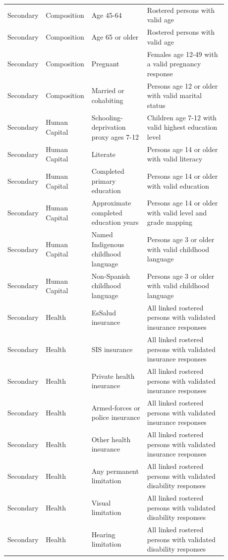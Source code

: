 \begin{longtable}{@{}>{\raggedright\arraybackslash}p{0.10\linewidth}p{0.17\linewidth}p{0.25\linewidth}p{0.36\linewidth}@{}}
Secondary & Composition & Age 45-64 & Rostered persons with valid age \\
Secondary & Composition & Age 65 or older & Rostered persons with valid age \\
Secondary & Composition & Pregnant & Females age 12-49 with a valid pregnancy response \\
Secondary & Composition & Married or cohabiting & Persons age 12 or older with valid marital status \\
Secondary & Human Capital & Schooling-deprivation proxy ages 7-12 & Children age 7-12 with valid highest education level \\
Secondary & Human Capital & Literate & Persons age 14 or older with valid literacy \\
Secondary & Human Capital & Completed primary education & Persons age 14 or older with valid education \\
Secondary & Human Capital & Approximate completed education years & Persons age 14 or older with valid level and grade mapping \\
Secondary & Human Capital & Named Indigenous childhood language & Persons age 3 or older with valid childhood language \\
Secondary & Human Capital & Non-Spanish childhood language & Persons age 3 or older with valid childhood language \\
Secondary & Health & EsSalud insurance & All linked rostered persons with validated insurance responses \\
Secondary & Health & SIS insurance & All linked rostered persons with validated insurance responses \\
Secondary & Health & Private health insurance & All linked rostered persons with validated insurance responses \\
Secondary & Health & Armed-forces or police insurance & All linked rostered persons with validated insurance responses \\
Secondary & Health & Other health insurance & All linked rostered persons with validated insurance responses \\
Secondary & Health & Any permanent limitation & All linked rostered persons with validated disability responses \\
Secondary & Health & Visual limitation & All linked rostered persons with validated disability responses \\
Secondary & Health & Hearing limitation & All linked rostered persons with validated disability responses \\

\end{longtable}
